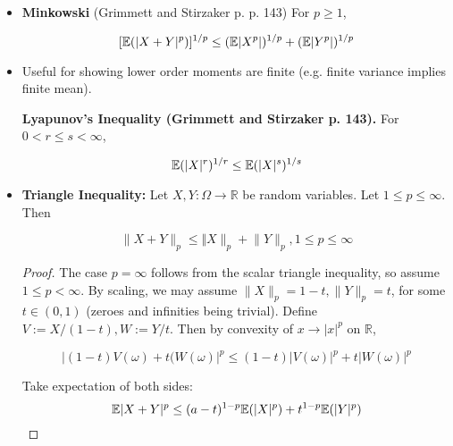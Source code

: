 \begin{itemize}
\begin{itemize}
\begin{proof}
\[
 \leq \log \bigg( \frac{1}{p} x^p + \frac{1}{q} y^q\bigg) 
 \]
 
 \[
 \implies (x^p)^{1/p}(y^q)^{1/q} \leq \frac{1}{p} x^p + \frac{1}{q} y^q
 \]
 
 Fixing an \(\omega \in \Omega\), we have
 
 \[
|X(\omega) Y(\omega)| =  (|X(\omega)|^p)^{1/p}(|Y(\omega)|^q)^{1/q} \leq \frac{1}{p}  |X(\omega)|^p + \frac{1}{q}  |Y(\omega)|^q
 \]
 
Integrating we have...
 
\end{proof}

\item \begin{theorem} \textbf{Minkowski} (Grimmett and Stirzaker p. p. 143) For \(p \geq 1\),

\[
[\mathbb{E}(|X + Y|^p)]^{1/p} \leq (\mathbb{E}|X^p|)^{1/p} + (\mathbb{E}|Y^p|)^{1/p}
\]
\end{theorem}

\item Useful for showing lower order moments are finite (e.g. finite variance implies finite mean). \begin{lemma}\textbf{Lyapunov's Inequality (Grimmett and Stirzaker p. 143).}\label{asym.lyapunov} For \(0 < r \leq s < \infty\),

\[
\mathbb{E}(|X|^r)^{1/r} \leq \mathbb{E}(|X|^s)^{1/s} 
\]
\end{lemma}

\item \begin{theorem}\label{asym.tri.ineq.norm} \textbf{Triangle Inequality:} Let \(X, Y: \Omega \to \mathbb{R}\) be random variables. Let \(1 \leq p \leq \infty\). Then

\[
\lVert X+Y\rVert_p \leq \Vert X\rVert_p + \lVert Y \rVert_p, 1 \leq p \leq \infty
\]

\begin{proof} The case \(p = \infty\) follows from the scalar triangle inequality, so assume \(1 \leq p < \infty\). By scaling, we may assume \(\lVert X \rVert_p = 1 - t, \lVert Y \rVert_p = t\), for some \(t \in (0,1)\) (zeroes and infinities being trivial). Define \(V:=X/(1-t), W:=Y/t\). Then by convexity of \(x \to |x|^p\) on \(\mathbb{R}\), 

\[
|(1-t)V(\omega) + t(W(\omega)|^p \leq (1-t)|V(\omega)|^p + t|W(\omega)|^p
\]

Take expectation of both sides:
\[
\mathbb{E}|X+Y|^p \leq (a-t)^{1-p}\mathbb{E}(|X|^p) + t^{1-p}\mathbb{E}(|Y|^p)
\]


\end{proof}
\end{theorem}
\end{itemize}
\end{itemize}
